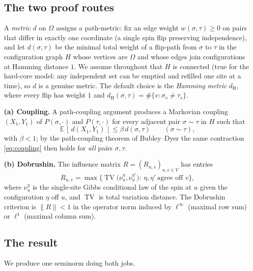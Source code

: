 \documentclass{amsart}
\DeclareMathOperator{\TV}{TV}
\newcommand{\Om}{\Omega}
\newcommand{\E}{\mathbb{E}}
\begin{document}
\subsection{The two proof routes}
A \emph{metric} $d$ on $\Om$ assigns a path-metric: fix an edge weight
$w(\sigma,\tau)\ge 0$ on pairs that differ in exactly one coordinate (a single
spin flip preserving independence), and let $d(\sigma,\tau)$ be the minimal
total weight of a flip-path from $\sigma$ to $\tau$ in the configuration graph
$H$ whose vertices are $\Om$ and whose edges join configurations at Hamming
distance $1$. We assume throughout that $H$ is connected (true for
the hard-core model: any independent set can be emptied and refilled one site at
a time), so $d$ is a genuine metric. The default choice is the \emph{Hamming
metric} $d_{\mathrm H}$, where every flip has weight $1$ and
$d_{\mathrm H}(\sigma,\tau)=\#\{v:\sigma_v\neq\tau_v\}$.

\medskip
\noindent\textbf{(a) Coupling.} A path-coupling argument produces a Markovian
coupling $(X_1,Y_1)$ of $P(\sigma,\cdot)$ and $P(\tau,\cdot)$ for every adjacent
pair $\sigma\sim\tau$ in $H$ such that
\begin{equation}\label{eq:coupling}
\E\,[\,d(X_1,Y_1)\,]\le \beta\, d(\sigma,\tau)\qquad(\sigma\sim\tau),
\end{equation}
with $\beta<1$; by the path-coupling theorem of Bubley--Dyer the same
contraction \eqref{eq:coupling} then holds for \emph{all} pairs $\sigma,\tau$.

\medskip
\noindent\textbf{(b) Dobrushin.} The influence matrix $R=(R_{u,v})_{u,v\in V}$
has entries
\begin{equation}\label{eq:influence}
R_{u,v}=\max\Big\{\TV\big(\nu_u^{\eta},\nu_u^{\eta'}\big):\ \eta,\eta'
\ \text{agree off }v\Big\},
\end{equation}
where $\nu_u^{\eta}$ is the single-site Gibbs conditional law of the spin at $u$
given the configuration $\eta$ off $u$, and $\TV$ is total variation distance.
The Dobrushin criterion is $\|R\|<1$ in the operator norm induced by $\ell^\infty$
(maximal row sum) or $\ell^1$ (maximal column sum).

\subsection{The result}
We produce one seminorm doing both jobs.
\end{document}

